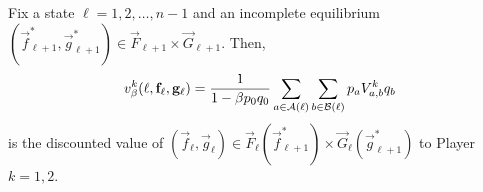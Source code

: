     \begin{lemma}  \label{lem:ordered-state-value}
        Fix a state $\ell = 1, 2, \ldots, n - 1$ and an incomplete equilibrium $(\vec{f}^*_{\ell + 1}, \vec{g}^*_{\ell + 1}) \in \vec{F}_{\ell + 1} \times \vec{G}_{\ell + 1}$.
        Then,
        \begin{equation} \label{eq:ordered-state-value}
            v^k_\beta(\ell, \mathbf{f}_\ell, \mathbf{g}_\ell)
                = \frac{1}{1 - \beta p_0 q_0} \sum_{a \in \mathcal{A}(\ell)} \sum_{b \in \mathcal{B}(\ell)} p_a V^k_{a, b} q_b
        \end{equation}
        is the discounted value of $(\vec{f}_\ell, \vec{g}_\ell) \in \vec{F}_\ell(\vec{f}^*_{\ell + 1}) \times \vec{G}_\ell(\vec{g}^*_{\ell + 1})$ to Player $k = 1, 2$.
    \end{lemma}


